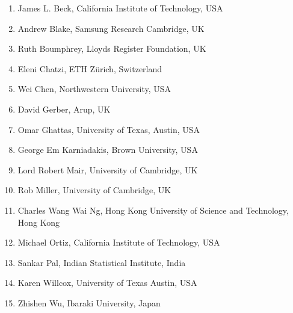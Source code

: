 \documentclass[11pt,a4paper]{scrartcl}
\theoremstyle{plain}  %
\begin{document}
\begin{enumerate}
\item James L. Beck, California Institute of Technology, USA
\item Andrew Blake, Samsung Research Cambridge, UK
\item Ruth Boumphrey, Lloyds Register Foundation, UK
\item Eleni Chatzi, ETH Zürich, Switzerland
\item Wei Chen, Northwestern University, USA
\item David Gerber, Arup, UK
\item Omar Ghattas, University of Texas, Austin, USA
\item George Em Karniadakis, Brown University, USA
\item Lord Robert Mair, University of Cambridge, UK
\item Rob Miller, University of Cambridge, UK
\item Charles Wang Wai Ng, Hong Kong University of Science and Technology, Hong Kong
\item Michael Ortiz, California Institute of Technology, USA
\item Sankar Pal, Indian Statistical Institute, India
\item Karen Willcox, University of Texas Austin, USA
\item Zhishen Wu, Ibaraki University, Japan
\end{enumerate}


%
\end{document}
